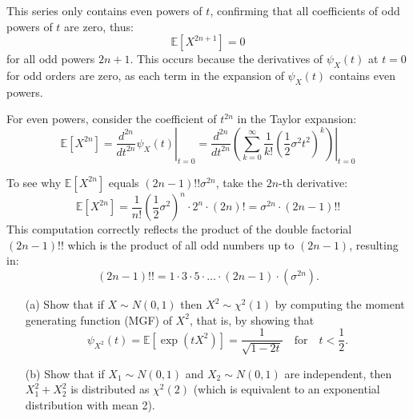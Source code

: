 \begin{enumerate}[label=(\alph*)]
    This series only contains even powers of \( t \), confirming that all coefficients of odd powers of \( t \) are zero, thus:
    \[
    \mathbb{E}[X^{2n+1}] = 0
    \]
    for all odd powers \( 2n+1 \). This occurs because the derivatives of \( \psi_X(t) \) at \( t=0 \) for odd orders are zero, as each term in the expansion of \( \psi_X(t) \) contains even powers.
    
    For even powers, consider the coefficient of \( t^{2n} \) in the Taylor expansion:
    \[
    \mathbb{E}[X^{2n}] = \left. \frac{d^{2n}}{dt^{2n}} \psi_X(t) \right|_{t=0} = \left. \frac{d^{2n}}{dt^{2n}} \left( \sum_{k=0}^{\infty} \frac{1}{k!} \left(\frac{1}{2}\sigma^2 t^2\right)^k \right) \right|_{t=0}
    \]
    
    To see why \( \mathbb{E}[X^{2n}] \) equals \((2n-1)!! \sigma^{2n}\), take the \(2n\)-th derivative:
    \[
    \mathbb{E}[X^{2n}] = \frac{1}{n!} \left(\frac{1}{2} \sigma^2\right)^n \cdot 2^n \cdot (2n)! = \sigma^{2n} \cdot (2n-1)!!
    \]
    This computation correctly reflects the product of the double factorial \((2n-1)!!\) which is the product of all odd numbers up to \((2n-1)\), resulting in:
    \[
    (2n-1)!! = 1 \cdot 3 \cdot 5 \cdot \ldots \cdot (2n-1) \cdot (\sigma^{2n}).
    \]
    
\end{enumerate}


\exercise

\begin{itemize}
    \item[(a)] Show that if \( X \sim N(0, 1) \) then \( X^2 \sim \chi^2(1) \) by computing the moment generating function (MGF) of \( X^2 \), that is, by showing that
    \[
    \psi_{X^2}(t) = \mathbb{E}[\exp(tX^2)] = \frac{1}{\sqrt{1-2t}} \quad \text{for} \quad t < \frac{1}{2}.
    \]

    \item[(b)] Show that if \( X_1 \sim N(0, 1) \) and \( X_2 \sim N(0, 1) \) are independent, then \( X_1^2 + X_2^2 \) is distributed as \( \chi^2(2) \) (which is equivalent to an exponential distribution with mean 2).
\end{itemize}

